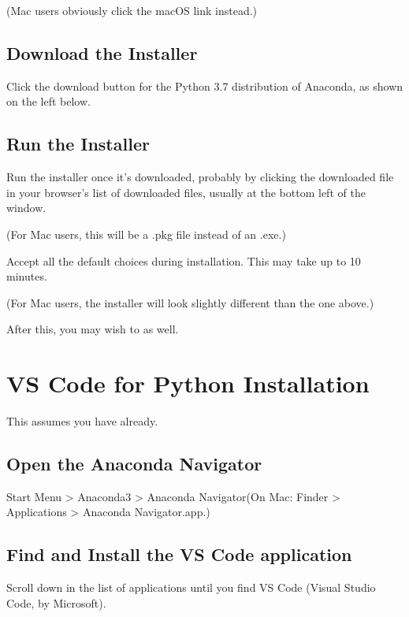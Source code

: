\documentclass[letterpaper,10pt,english]{sphinxmanual}
\begin{document}
(Mac users obviously click the macOS link instead.)


\section{Download the Installer}
\label{\detokenize{anaconda-installation:download-the-installer}}
Click the download button for the Python 3.7 distribution of Anaconda,
as shown on the left below.




\section{Run the Installer}
\label{\detokenize{anaconda-installation:run-the-installer}}
Run the installer once it’s downloaded, probably by clicking the
downloaded file in your browser’s list of downloaded files, usually at
the bottom left of the window.



(For Mac users, this will be a .pkg file instead of an .exe.)

Accept all the default choices during installation. This may take up to
10 minutes.



(For Mac users, the installer will look slightly different than the one
above.)

After this, you may wish to {\hyperref[\detokenize{vs-code-installation::doc}]{}} as well.


\chapter{VS Code for Python Installation}
\label{\detokenize{vs-code-installation:vs-code-for-python-installation}}\label{\detokenize{vs-code-installation::doc}}
This assumes you have {\hyperref[\detokenize{anaconda-installation::doc}]{}} already.


\section{Open the Anaconda Navigator}
\label{\detokenize{vs-code-installation:open-the-anaconda-navigator}}
Start Menu > Anaconda3 > Anaconda Navigator(On Mac: Finder > Applications > Anaconda Navigator.app.)




\section{Find and Install the VS Code application}
\label{\detokenize{vs-code-installation:find-and-install-the-vs-code-application}}
Scroll down in the list of applications until you find VS Code (Visual
Studio Code, by Microsoft).
\end{document}
